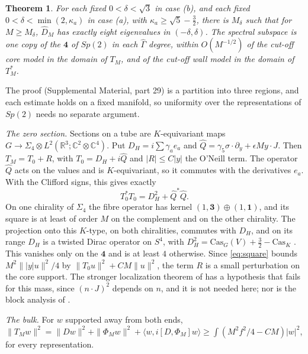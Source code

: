 \documentclass[aps,prd,reprint,onecolumn,nofootinbib,amsmath,amssymb,floatfix]{revtex4-2}
\theoremstyle{plain}
\newtheorem{theorem}{Theorem}
\newcommand{\C}{\mathbb C}
\newcommand{\R}{\mathbb R}
\newcommand{\hatD}{\widehat D}
\newcommand{\supp}[1]{Supplemental Material, part #1}
\begin{document}
\begin{theorem}\label{thm:window}
For each fixed $0<\delta<\sqrt3$ in case (b), and each fixed $0<\delta<\min(2,\kappa_a)$ in case (a), with $\kappa_a\ge\sqrt5-\tfrac32$, there is $M_\delta$ such that for $M\ge M_\delta$, $\hatD_M$ has exactly eight eigenvalues in $(-\delta,\delta)$. The spectral subspace is one copy of the $\mathbf 4$ of $Sp(2)$ in each $\hat\Gamma$ degree, within $O(M^{-1/2})$ of the cut-off core model in the domain of $T_M$, and of the cut-off wall model in the domain of $T_M^*$.
\end{theorem}

The proof (\supp{29}) is a partition into three regions, and each estimate holds on a fixed manifold, so uniformity over the representations of $Sp(2)$ needs no separate argument.

\emph{The zero section.} Sections on a tube are $K$-equivariant maps $G\to\Sigma_4\otimes L^2(\R^3;\C^2\otimes\C^4)$. Put $D_H=i\sum\gamma_ae_a$ and $\hat Q=\gamma_5\sigma\cdot\partial_y+\epsilon My\cdot J$. Then $T_M=T_0+R$, with $T_0=D_H+i\hat Q$ and $|R|\le C|y|$ the O'Neill term. The operator $\hat Q$ acts on the values and is $K$-equivariant, so it commutes with the derivatives $e_a$. With the Clifford signs, this gives exactly
\begin{equation}\label{eq:square}
T_0^*T_0=D_H^2+\hat Q^*\hat Q.
\end{equation}
On one chirality of $\Sigma_4$ the fibre operator has kernel $(1,\mathbf 3)\oplus(1,\mathbf 1)$, and its square is at least of order $M$ on the complement and on the other chirality. The projection onto this $K$-type, on both chiralities, commutes with $D_H$, and on its range $D_H$ is a twisted Dirac operator on $S^4$, with $D_H^2=\mathrm{Cas}_G(V)+\tfrac32-\mathrm{Cas}_K$ \cite{Parthasarathy1972}. This vanishes only on the $\mathbf 4$ and is at least $4$ otherwise. Since \eqref{eq:square} bounds $M^2\||y|u\|^2/4$ by $\|T_0u\|^2+CM\|u\|^2$, the term $R$ is a small perturbation on the core support. The stronger localization theorem of \cite{Maridakis2021} has a hypothesis that fails for this mass, since $(n\cdot J)^2$ depends on $n$, and it is not needed here; nor is the block analysis of \cite{BL1991}.

\emph{The bulk.} For $w$ supported away from both ends, $\|T_Mw\|^2=\|Dw\|^2+\|\Phi_Mw\|^2+\langle w,i[D,\Phi_M]w\rangle\ge\int(M^2f^2/4-CM)|w|^2$, for every representation.
\end{document}
